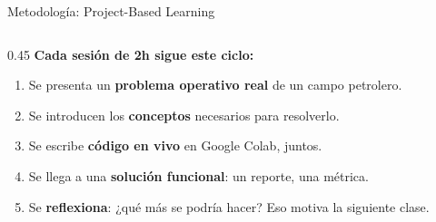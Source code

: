 \documentclass[aspectratio=169, 11pt]{beamer}
\begin{document}
\begin{frame}{Metodología: Project-Based Learning}
\begin{columns}[T]
    \begin{column}{0.45\textwidth}
      {\small\color{arcaDark}\bfseries Cada sesión de 2h sigue este ciclo:}

      \vspace{6pt}
      {\footnotesize
      \begin{enumerate}\setlength{\itemsep}{3pt}
        \item[\textbf{\color{arcaRed}1.}] Se presenta un \textbf{problema operativo real} de un campo petrolero.

        \item[\textbf{\color{arcaRed}2.}] Se introducen los \textbf{conceptos} necesarios para resolverlo.

        \item[\textbf{\color{arcaRed}3.}] Se escribe \textbf{código en vivo} en Google Colab, juntos.

        \item[\textbf{\color{arcaRed}4.}] Se llega a una \textbf{solución funcional}: un reporte, una métrica.

        \item[\textbf{\color{arcaRed}5.}] Se \textbf{reflexiona}: ¿qué más se podría hacer? Eso motiva la siguiente clase.
      \end{enumerate}
      }


    \end{column}
  \end{columns}
\end{frame}
\end{document}
